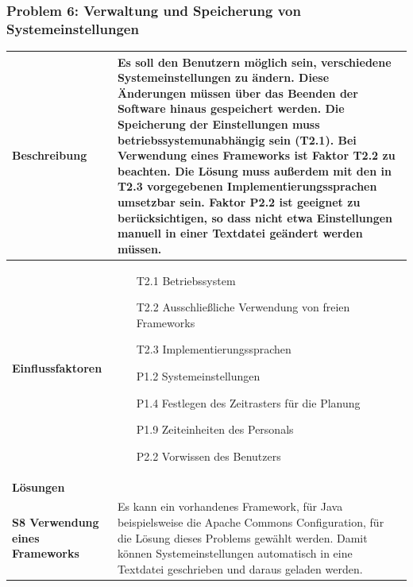 \documentclass[fontsize=12pt,paper=a4,twoside]{scrartcl}
\begin{document}
\subsubsection{Problem 6: Verwaltung und Speicherung von Systemeinstellungen}
\begin{tabularx}{\textwidth}{|p{6cm}|X|}
 \hline
 \textbf{Beschreibung} & 
Es soll den Benutzern möglich sein, verschiedene Systemeinstellungen zu ändern. Diese Änderungen müssen über das Beenden der Software hinaus gespeichert werden. Die Speicherung der Einstellungen muss betriebssystemunabhängig sein (T2.1). Bei Verwendung eines Frameworks ist Faktor T2.2 zu beachten. Die Lösung muss außerdem mit den in T2.3 vorgegebenen Implementierungssprachen umsetzbar sein. Faktor P2.2 ist geeignet zu berücksichtigen, so dass nicht etwa Einstellungen manuell in einer Textdatei geändert werden müssen. \\\hline
 \textbf{Einflussfaktoren} &
 \begin{itemize}
\item[T2.1] Betriebssystem
\item[T2.2] Ausschließliche Verwendung von freien Frameworks
\item[T2.3] Implementierungssprachen
\item[P1.2] Systemeinstellungen
\item[P1.4] Festlegen des Zeitrasters für die Planung
\item[P1.9] Zeiteinheiten des Personals
\item[P2.2] Vorwissen des Benutzers
 \end{itemize}\\\hline
\multicolumn{2}{|l|}{\textbf{Lösungen}} \\\hline
\textbf{S8 Verwendung eines Frameworks} & Es kann ein vorhandenes Framework, für Java beispielsweise die Apache Commons Configuration, für die Lösung dieses Problems gewählt werden. Damit können Systemeinstellungen automatisch in eine Textdatei geschrieben und daraus geladen werden.\\\hline
\end{tabularx}
\newpage
\end{document}
